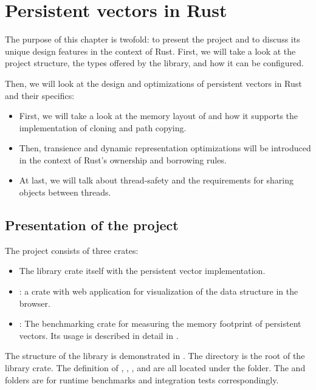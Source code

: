 \chapter{Persistent vectors in Rust}
\label{chapter:persistent-vectors-in-rust}

The purpose of this chapter is twofold: to present the \pvecrs{} project and to discuss its unique design features in the context of Rust. First, we will take a look at the project structure, the types offered by the library, and how it can be configured.

Then, we will look at the design and optimizations of persistent vectors in Rust and their specifics:

\begin{itemize}
    \item First, we will take a look at the memory layout of \rrbtree{} and how it supports the implementation of cloning and path copying.
    \item Then, transience and dynamic representation optimizations will be introduced in the context of Rust's ownership and borrowing rules.
    \item At last, we will talk about thread-safety and the requirements for sharing objects between threads.
\end{itemize}

\section{Presentation of the project}
The \pvecrs{} project consists of three crates:
\begin{itemize}
    \item The library crate itself with the persistent vector implementation.
    \item {}: a crate with web application for visualization of the data structure in the browser.
    \item {}: The benchmarking crate for measuring the memory footprint of persistent vectors. Its usage is described in detail in .
\end{itemize}

The structure of the library is demonstrated in . The  directory is the root of the library crate. The definition of \rrbtree{}, \rbvec{}, \rrbvec{}, and \pvec{} are all located under the  folder. The  and  folders are for runtime benchmarks and integration tests correspondingly.

